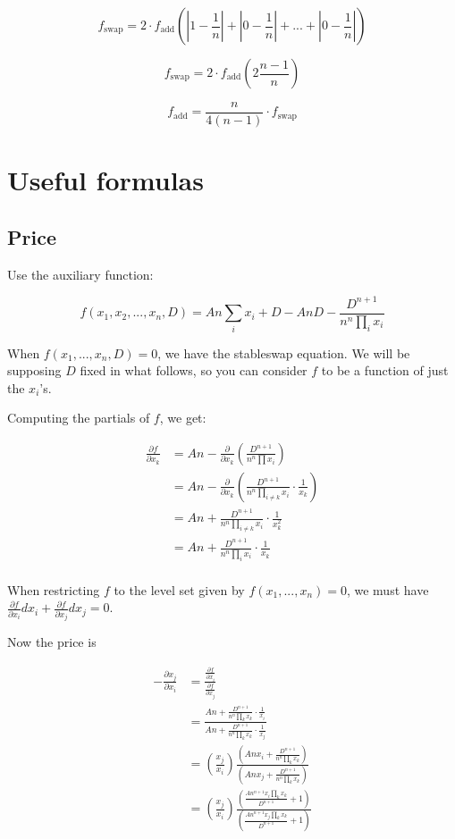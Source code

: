 \documentclass[
]{article}
\begin{document}
\[  f_{\operatorname{swap}} = 2 \cdot f_{\operatorname{add}} \left( \left|1 - \frac{1}{n}\right| + \left|0 - \frac{1}{n}\right| + ... + \left|0 - \frac{1}{n}\right| \right)\]

\[  f_{\operatorname{swap}} = 2 \cdot f_{\operatorname{add}} \left( 2 \frac{n-1}{n} \right)\]

\[  f_{\operatorname{add}} = \frac{n}{4(n - 1)} \cdot f_{\operatorname{swap}}\]

\hypertarget{useful-formulas}{%
\section{Useful formulas}\label{useful-formulas}}

\hypertarget{price}{%
\subsection{Price}\label{price}}

Use the auxiliary function:

\[ f(x_1, x_2, ..., x_n, D) = A n \sum_i x_i + D - A n D - \frac{D^{n+1}}{n^n \prod_i x_i} \]

When \(f(x_1, ..., x_n, D) = 0\), we have the stableswap equation. We
will be supposing \(D\) fixed in what follows, so you can consider \(f\)
to be a function of just the \(x_i\)'s.

Computing the partials of \(f\), we get:

\[\begin{aligned}
\frac{\partial f}{\partial x_k} &= A n - \frac{\partial}{\partial x_k}\left(\frac{D^{n+1}}{n^n \prod x_i}\right) \\
&= A n -  \frac{\partial}{\partial x_k}\left(\frac{D^{n+1}}{n^n \prod_{i\neq k} x_i} \cdot \frac{1}{x_k}\right)\\
&= A n + \frac{D^{n+1}}{n^n \prod_{i\neq k} x_i} \cdot \frac{1}{x_k^2} \\
&= A n + \frac{D^{n+1}}{n^n \prod_{i} x_i} \cdot \frac{1}{x_k} \\
\end{aligned}\]

When restricting \(f\) to the level set given by
\(f(x_1, ..., x_n) = 0\), we must have
\(\frac{\partial f}{\partial x_i} dx_i + \frac{\partial f}{\partial x_j} dx_j = 0\).

Now the price is

\[\begin{aligned}
- \frac{\partial x_j}{\partial x_i} &= \frac{\frac{\partial f}{\partial x_i}}{\frac{\partial f}{\partial x_j}}\\[1.2ex]
&= \frac{A n + \frac{D^{n+1}}{n^n \prod_{k} x_k} \cdot \frac{1}{x_i}}{A n + \frac{D^{n+1}}{n^n \prod_{k} x_k} \cdot \frac{1}{x_j}} \\[1.2ex]
&= \left( \frac{x_j}{x_i} \right) \frac{\left(A n x_i + \frac{D^{n+1}}{n^n \prod_{k} x_k}\right)}{\left(A n x_j + \frac{D^{n+1}}{n^n \prod_{k} x_k}\right)} \\[1.0ex]
&= \left( \frac{x_j}{x_i} \right) \frac{\left(\frac{A n^{n+1} x_i \prod_k x_k}{D^{n+1}} + 1 \right)}{\left(\frac{A n^{n+1} x_j \prod_k x_k}{D^{n+1}} + 1 \right)} \\[1.0ex]
\end{aligned}\]
\end{document}
